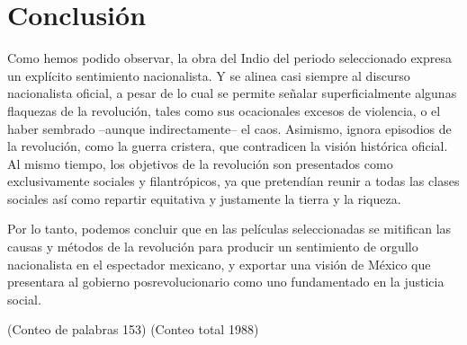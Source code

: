 \section{Conclusión}
Como hemos podido observar, la obra del Indio del periodo seleccionado expresa un explícito sentimiento nacionalista. Y se alinea casi siempre al discurso nacionalista oficial, a pesar de lo cual se permite señalar superficialmente algunas flaquezas de la revolución, tales como sus ocacionales excesos de violencia, o el haber sembrado --aunque indirectamente-- el caos. Asimismo, ignora episodios  de la revolución, como la guerra cristera,  que contradicen la visión histórica oficial. Al mismo tiempo, los objetivos de la revolución son presentados como exclusivamente sociales y filantrópicos, ya que pretendían reunir a todas las clases sociales así como repartir equitativa y justamente la tierra y la riqueza.

Por lo tanto, podemos concluir que en las películas seleccionadas se mitifican  las causas y métodos de la revolución para producir un sentimiento de orgullo nacionalista en el espectador mexicano, y exportar una visión de México que presentara al gobierno posrevolucionario como uno fundamentado en la justicia social.


(Conteo de palabras 153)
(Conteo total 1988)

